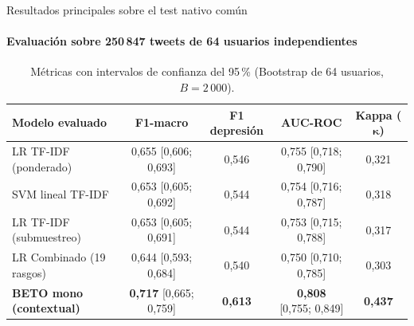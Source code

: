 \begin{frame}{Resultados principales sobre el test nativo común}
  \framesubtitle{Evaluación sobre 250\,847 tweets de 64 usuarios independientes}

  \begin{table}
    \centering\scriptsize
    \setlength{\tabcolsep}{4pt}
    \caption{Métricas con intervalos de confianza del 95\,\% (Bootstrap de 64 usuarios, $B=2\,000$).}
    \begin{tabular}{lcccc}
      \toprule
      \textbf{Modelo evaluado} & \textbf{F1-macro} & \textbf{F1 depresión} & \textbf{AUC-ROC} & \textbf{Kappa ($\boldsymbol{\kappa}$)} \\
      \midrule
      LR TF-IDF (ponderado) & 0{,}655 \tiny{[0{,}606; 0{,}693]} & 0{,}546 & 0{,}755 \tiny{[0{,}718; 0{,}790]} & 0{,}321 \\
      SVM lineal TF-IDF & 0{,}653 \tiny{[0{,}605; 0{,}692]} & 0{,}544 & 0{,}754 \tiny{[0{,}716; 0{,}787]} & 0{,}318 \\
      LR TF-IDF (submuestreo) & 0{,}653 \tiny{[0{,}605; 0{,}691]} & 0{,}544 & 0{,}753 \tiny{[0{,}715; 0{,}788]} & 0{,}317 \\
      LR Combinado (19 rasgos) & 0{,}644 \tiny{[0{,}593; 0{,}684]} & 0{,}540 & 0{,}750 \tiny{[0{,}710; 0{,}785]} & 0{,}303 \\
      \rowcolor{filaResaltada}
      \textbf{BETO mono (contextual)} & \textbf{0{,}717} \tiny{[0{,}665; 0{,}759]} & \textbf{0{,}613} & \textbf{0{,}808} \tiny{[0{,}755; 0{,}849]} & \textbf{0{,}437} \\
      \bottomrule
    \end{tabular}
  \end{table}

  \vskip-0.15cm
  \begin{columns}[T]
  \end{columns}

\end{frame}

